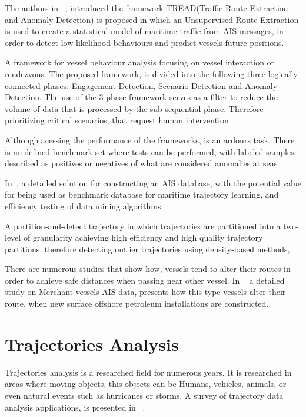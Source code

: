The authors in ~\cite{Pallotta2013}, introduced the framework TREAD(Traffic Route Extraction and Anomaly Detection) is proposed in which an Unsupervised Route Extraction is used to create a statistical model of maritime traffic from AIS messages, in order to detect low-likelihood behaviours and predict vessels future positions.

A framework for vessel behaviour analysis focusing on vessel interaction or rendezvous. The proposed framework, is divided into the following three logically connected phases: Engagement Detection, Scenario  Detection and Anomaly Detection. The use of the 3-phase framework serves as a filter to reduce the volume of data that is processed by the sub-sequential phase. Therefore prioritizing critical scenarios, that request human intervention ~\cite{Shahir2015}.

Although acessing the performance of the frameworks, is an ardours task. There is no defined benchmark set where tests can be performed, with labeled samples described as positives or negatives of what are considered anomalies at seas ~\cite{Laxhammar2008}. 

In~\cite{Mao2016}, a detailed solution for constructing an AIS database, with the potential value for being used as benchmark database for maritime trajectory learning, and efficiency testing of data mining algorithms.

A partition-and-detect trajectory in which trajectories are partitioned into a two-level of granularity achieving high efficiency and high quality trajectory partitions, therefore detecting outlier trajectories using density-based methods, ~\cite{Lee}.

There are numerous studies that show how, vessels tend to alter their routes in order to achieve safe distances when passing near other vessel. In ~\cite{2017Offshore} a detailed study on Merchant vessels AIS data, presents how this type vessels alter their route, when new surface offshore petroleum installations are constructed.

\section{Trajectories Analysis}
\label{section: Trajectory Analysis}
Trajectories analysis is a researched field for numerous years. It is researched in areas where moving objects, this objects can be Humans, vehicles, animals, or even natural events such as hurricanes or storms.
A survey of trajectory data analysis applications, is presented in ~\cite{Feng2016}.

